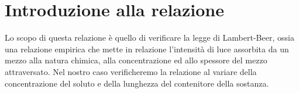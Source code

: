 \section{Introduzione alla relazione}

Lo scopo di questa relazione è quello di verificare la legge di Lambert-Beer, ossia una relazione empirica che mette in relazione l'intensità di luce assorbita da un mezzo alla natura chimica, alla concentrazione ed allo spessore del mezzo attraversato.
Nel nostro caso verificheremo la relazione al variare della concentrazione del soluto e della lunghezza del contenitore della sostanza.

